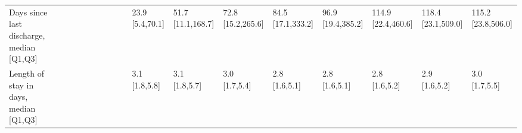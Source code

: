\begin{tabular}{llllllllllllllllll}
Days since last discharge, median [Q1,Q3] &   &                              &                 &                 &                 &                 &                 &                 &                &   23.9 [5.4,70.1] &  51.7 [11.1,168.7] &  72.8 [15.2,265.6] &  84.5 [17.1,333.2] &  96.9 [19.4,385.2] &  114.9 [22.4,460.6] &  118.4 [23.1,509.0] &  115.2 [23.8,506.0] \\
Length of stay in days, median [Q1,Q3] &   &                              &                 &                 &                 &                 &                 &                 &                &     3.1 [1.8,5.8] &      3.1 [1.8,5.7] &      3.0 [1.7,5.4] &      2.8 [1.6,5.1] &      2.8 [1.6,5.1] &       2.8 [1.6,5.2] &       2.9 [1.6,5.2] &       3.0 [1.7,5.5] \\
\bottomrule
\end{tabular}
